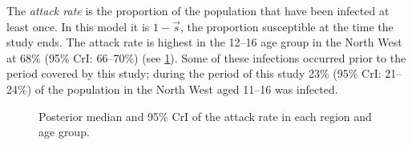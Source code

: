 \documentclass[thesis.tex]{subfiles}
\begin{document}
The \emph{attack rate} is the proportion of the population that have been infected at least once.
In this model it is $1 - \vec{s}$, the proportion susceptible at the time the study ends.
The attack rate is highest in the 12--16 age group in the North West at 68\% (95\% CrI: 66--70\%) (see \cref{SEIR:fig:attack-rates}).
Some of these infections occurred prior to the period covered by this study; during the period of this study 23\% (95\% CrI: 21--24\%) of the population in the North West aged 11--16 was infected.
\begin{figure}
    \caption[Posterior estimates of the attack rate.]{Posterior median and 95\% CrI of the attack rate in each region and age group.}
    \label{SEIR:fig:attack-rates}
\end{figure}
\end{document}
